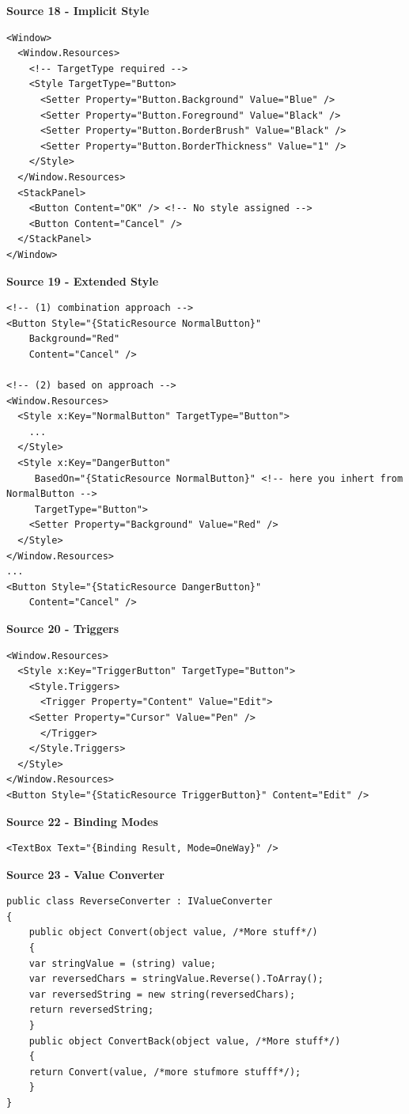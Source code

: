 \documentclass[10pt,twoside,landscape]{article}
\begin{document}
\begin{multicols}{2}
\textbf{Source 18 - Implicit Style}
\lstset{language=XML,label= ,caption= ,captionpos=b,numbers=none}
\begin{lstlisting}
<Window>
  <Window.Resources>
    <!-- TargetType required -->
    <Style TargetType="Button>
      <Setter Property="Button.Background" Value="Blue" />
      <Setter Property="Button.Foreground" Value="Black" />
      <Setter Property="Button.BorderBrush" Value="Black" />
      <Setter Property="Button.BorderThickness" Value="1" />
    </Style>
  </Window.Resources>
  <StackPanel>
    <Button Content="OK" /> <!-- No style assigned -->
    <Button Content="Cancel" />
  </StackPanel>
</Window>
\end{lstlisting}


\textbf{Source 19 - Extended Style}
\lstset{language=XML,label= ,caption= ,captionpos=b,numbers=none}
\begin{lstlisting}
<!-- (1) combination approach -->
<Button Style="{StaticResource NormalButton}"
	Background="Red"
	Content="Cancel" />

<!-- (2) based on approach -->
<Window.Resources>
  <Style x:Key="NormalButton" TargetType="Button">
    ...
  </Style>
  <Style x:Key="DangerButton"
	 BasedOn="{StaticResource NormalButton}" <!-- here you inhert from NormalButton -->
	 TargetType="Button">
    <Setter Property="Background" Value="Red" />
  </Style>
</Window.Resources>
...
<Button Style="{StaticResource DangerButton}"
	Content="Cancel" />
\end{lstlisting}

\textbf{Source 20 - Triggers}
\lstset{language=XML,label= ,caption= ,captionpos=b,numbers=none}
\begin{lstlisting}
<Window.Resources>
  <Style x:Key="TriggerButton" TargetType="Button">
    <Style.Triggers>
      <Trigger Property="Content" Value="Edit">
	<Setter Property="Cursor" Value="Pen" />
      </Trigger>
    </Style.Triggers>
  </Style>
</Window.Resources>
<Button Style="{StaticResource TriggerButton}" Content="Edit" />
\end{lstlisting}

\textbf{Source 22 - Binding Modes}
\lstset{language=XML,label= ,caption= ,captionpos=b,numbers=none}
\begin{lstlisting}
<TextBox Text="{Binding Result, Mode=OneWay}" />
\end{lstlisting}

\textbf{Source 23 - Value Converter}
\lstset{language=csharp,label= ,caption= ,captionpos=b,numbers=none}
\begin{lstlisting}
public class ReverseConverter : IValueConverter
{
    public object Convert(object value, /*More stuff*/)
    {
	var stringValue = (string) value;
	var reversedChars = stringValue.Reverse().ToArray();
	var reversedString = new string(reversedChars);
	return reversedString;
    }
    public object ConvertBack(object value, /*More stuff*/)
    {
	return Convert(value, /*more stufmore stufff*/);
    }
}
\end{lstlisting}


\end{multicols}
\end{document}
